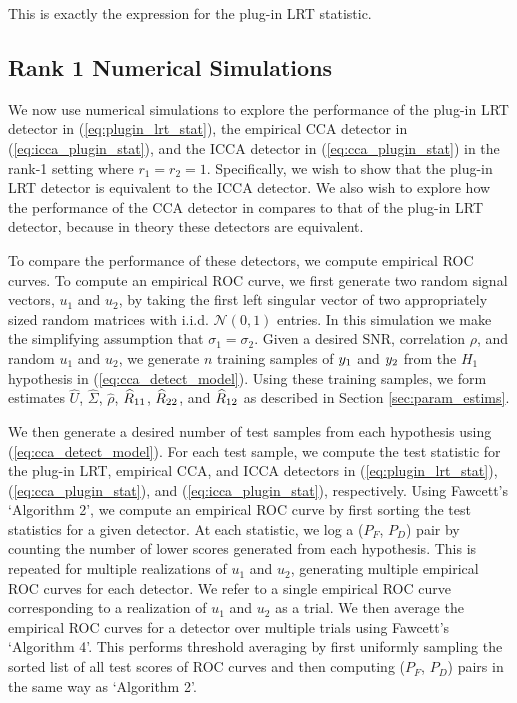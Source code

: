 This is exactly the expression for the plug-in LRT statistic.

\subsection{Rank 1 Numerical Simulations}

We now use numerical simulations to explore the performance of the plug-in LRT detector in
(\ref{eq:plugin_lrt_stat}), the empirical CCA detector in (\ref{eq:icca_plugin_stat}), and
the ICCA detector in (\ref{eq:cca_plugin_stat}) in the rank-1 setting where
$r_1=r_2=1$. Specifically, we wish to show that the plug-in LRT detector is
equivalent to the ICCA detector. We also wish to explore how the performance of the
CCA detector in compares to that of the plug-in LRT detector, because in theory these
detectors are equivalent.

To compare the performance of these detectors, we compute empirical ROC curves. To
compute an empirical ROC curve, we first generate  two random signal vectors, $u_1$ and
$u_2$, by taking the first left singular vector of two appropriately sized random
matrices with i.i.d. $\mathcal{N}(0,1)$ entries. In this simulation we make the
simplifying assumption that $\sigma_1=\sigma_2$. Given a desired SNR, correlation $\rho$,
and random $u_1$ and $u_2$, we generate $n$ training samples of $y_1$ and $y_2$ from the
$H_1$ hypothesis in (\ref{eq:cca_detect_model}). Using these training samples, we form
estimates $\widehat{U}$, $\widehat{\Sigma}$, $\widehat{\rho}$, $\widehat{R}_{11}$, $\widehat{R}_{22}$, and
$\widehat{R}_{12}$ as described in Section \ref{sec:param_estims}.

We then generate a desired number of test samples from each hypothesis using
(\ref{eq:cca_detect_model}). For each test sample, we compute the test statistic for the
plug-in LRT, empirical CCA, and ICCA detectors in (\ref{eq:plugin_lrt_stat}),
(\ref{eq:cca_plugin_stat}), and (\ref{eq:icca_plugin_stat}), respectively. Using Fawcett's
\cite{fawcett2006introduction} `Algorithm 2', we compute an empirical ROC curve by first
sorting the test statistics for a given detector. At each statistic, we log a ($P_F$,
$P_D$) pair by counting the number of lower scores generated from each hypothesis. This is
repeated for multiple realizations of $u_1$ and $u_2$, generating multiple empirical ROC
curves for each detector. We refer to a single empirical ROC curve corresponding to a
realization of $u_1$ and $u_2$ as a trial. We then average the empirical ROC curves for a
detector over multiple trials using Fawcett's \cite{fawcett2006introduction} `Algorithm
4'. This performs threshold averaging by first uniformly sampling the sorted list of all
test scores of ROC curves and then computing ($P_F$, $P_D$) pairs in the same way as
`Algorithm 2'.

